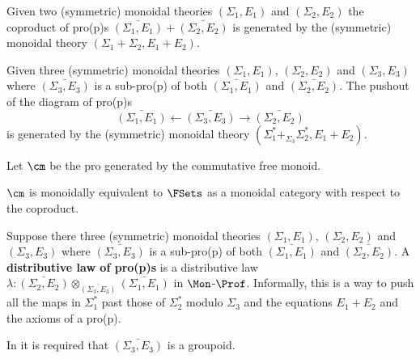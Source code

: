 \begin{lemma}
Given two (symmetric) monoidal theories $(\Sigma_1,E_1)$  and $(\Sigma_2,E_2)$  the coproduct of pro(p)s  $\bar{(\Sigma_1,E_1)}+\bar{(\Sigma_2,E_2)}$ is generated by the (symmetric) monoidal theory $(\Sigma_1+\Sigma_2,E_1+E_2)$.
\end{lemma}


\begin{lemma}
Given three  (symmetric) monoidal theories $(\Sigma_1,E_1)$, $(\Sigma_2,E_2)$ and $(\Sigma_3,E_3)$ where $\bar{(\Sigma_3,E_3)}$ is a sub-pro(p) of both $\bar{(\Sigma_1,E_1)}$ and $\bar{(\Sigma_2,E_2)}$.  The pushout of the diagram of pro(p)s
$$
\bar{(\Sigma_1,E_1)} \leftarrow \bar{(\Sigma_3,E_3)}\rightarrow \bar{(\Sigma_2,E_2)}
$$
is generated by the (symmetric) monoidal theory $(\Sigma_1^* +_{\Sigma_3} \Sigma_2^*, E_1 + E_2)$.
\end{lemma}




\begin{definition}
\label{def:walkingcmonoid}
Let $\cm$ be the pro generated by the commutative free monoid.
\end{definition}


\begin{lemma}
\label{lem:setpres}
$\cm$ is monoidally equivalent to $\FSets$ as a monoidal category with respect to the coproduct.
\end{lemma}

\begin{definition}
\label{def:distmonad}
\end{definition}


\begin{lemma}
\label{lem:distmonoidaltheory}


Suppose there three  (symmetric) monoidal theories $(\Sigma_1,E_1)$, $(\Sigma_2,E_2)$ and $(\Sigma_3,E_3)$ where $\bar{(\Sigma_3,E_3)}$ is a sub-pro(p) of both $\bar{(\Sigma_1,E_1)}$ and $\bar{(\Sigma_2,E_2)}$. A {\bf distributive law of pro(p)s} is a distributive law $\lambda:\bar{(\Sigma_2,E_2)} \otimes_{\bar{(\Sigma_3,E_3)}} \bar{ (\Sigma_1,E_1)}$   in $\Mon$-$\Prof$.  Informally, this is a way to push all the maps in $\Sigma_1^*$ past those of  $\Sigma_2^*$ modulo $\Sigma_3$ and the equations $E_1+E_2$ and the axioms of a pro(p).
\end{lemma}



In \cite{lack} it is required that $\bar{(\Sigma_3,E_3)}$ is a groupoid.

